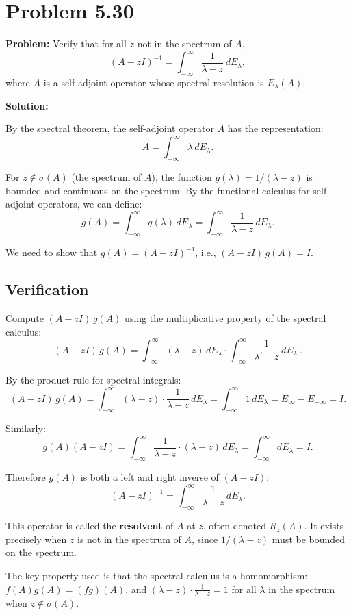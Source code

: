 \documentclass[12pt]{article}
\begin{document}
\section*{Problem 5.30}

\textbf{Problem:} Verify that for all $z$ not in the spectrum of $A$,
\[
(A - zI)^{-1} = \int_{-\infty}^{\infty}\frac{1}{\lambda - z}\,dE_\lambda,
\]
where $A$ is a self-adjoint operator whose spectral resolution is $E_\lambda(A)$.

\bigskip
\textbf{Solution:}

By the spectral theorem, the self-adjoint operator $A$ has the representation:
\[
A = \int_{-\infty}^{\infty}\lambda\,dE_\lambda.
\]

For $z \notin \sigma(A)$ (the spectrum of $A$), the function $g(\lambda) = 1/(\lambda - z)$ is bounded and continuous on the spectrum. By the functional calculus for self-adjoint operators, we can define:
\[
g(A) = \int_{-\infty}^{\infty}g(\lambda)\,dE_\lambda = \int_{-\infty}^{\infty}\frac{1}{\lambda - z}\,dE_\lambda.
\]

We need to show that $g(A) = (A - zI)^{-1}$, i.e., $(A - zI)\,g(A) = I$.

\subsection*{Verification}

Compute $(A - zI)\,g(A)$ using the multiplicative property of the spectral calculus:
\[
(A - zI)\,g(A) = \int_{-\infty}^{\infty}(\lambda - z)\,dE_\lambda \cdot \int_{-\infty}^{\infty}\frac{1}{\lambda' - z}\,dE_{\lambda'}.
\]

By the product rule for spectral integrals:
\[
(A - zI)\,g(A) = \int_{-\infty}^{\infty}(\lambda - z)\cdot\frac{1}{\lambda - z}\,dE_\lambda = \int_{-\infty}^{\infty}1\,dE_\lambda = E_\infty - E_{-\infty} = I.
\]

Similarly:
\[
g(A)(A - zI) = \int_{-\infty}^{\infty}\frac{1}{\lambda-z}\cdot(\lambda-z)\,dE_\lambda = \int_{-\infty}^{\infty}dE_\lambda = I.
\]

Therefore $g(A)$ is both a left and right inverse of $(A - zI)$:
\[
\boxed{(A - zI)^{-1} = \int_{-\infty}^{\infty}\frac{1}{\lambda - z}\,dE_\lambda.}
\]

This operator is called the \textbf{resolvent} of $A$ at $z$, often denoted $R_z(A)$. It exists precisely when $z$ is not in the spectrum of $A$, since $1/(\lambda - z)$ must be bounded on the spectrum.

The key property used is that the spectral calculus is a homomorphism: $f(A)g(A) = (fg)(A)$, and $(\lambda - z)\cdot\frac{1}{\lambda - z} = 1$ for all $\lambda$ in the spectrum when $z\notin\sigma(A)$.
\end{document}
